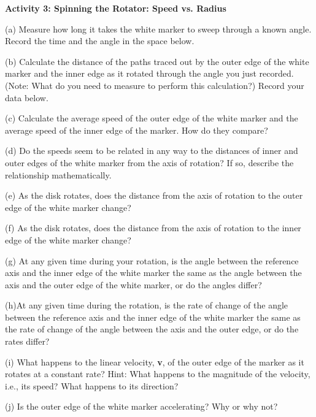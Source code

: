 \textbf{Activity 3: Spinning the Rotator: Speed vs. Radius} 

(a) Measure how long it takes the white marker to sweep through a known angle.
Record the time and the angle in the space below.
\vspace{10mm}

(b) Calculate the distance of the paths traced out by the outer edge of the white marker and the inner edge as it rotated through the angle you just recorded.
(Note: What do you need to measure to perform this calculation?) Record your
data below.
\vspace{20mm}

(c) Calculate the average speed of the outer edge of the white marker and the
average speed of the inner edge of the marker. How do they compare?
\vspace{20mm}

(d) Do the speeds seem to be related in any way to the distances of inner and
outer edges of the white marker from the axis of rotation? If so, describe the
relationship mathematically.
\vspace{18mm}

(e) As the disk rotates, does the distance from the axis of rotation to the outer edge of the white marker change?
\vspace{10mm}

(f) As the disk rotates, does the distance from the axis of rotation to the inner edge of the white marker change?
\vspace{10mm}

(g) At any given time during your rotation, is the angle between the reference
axis and the inner edge of the white marker the same as the angle between the
axis and the outer edge of the white marker, or do the angles differ?
\vspace{10mm}

(h)At any given time during the rotation, is the rate of change of the angle
between the reference axis and the inner edge of the white marker the same as
the rate of change of the angle between the axis and the outer edge, or do the
rates differ?
\vspace{10mm}

(i) What happens to the linear velocity, \textbf{v}, of the outer edge of the
marker as it rotates at a constant rate? Hint: What happens to the magnitude
of the velocity, i.e., its speed? What happens to its direction?
\vspace{20mm}

(j) Is the outer edge of the white marker accelerating? Why or why not?
\vspace{20mm}

